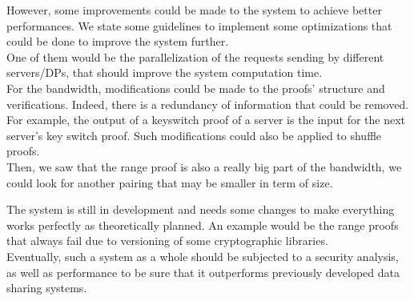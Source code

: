 \documentclass{article}
\begin{document}
However, some improvements could be made to the system to achieve better performances. We state some guidelines to implement some optimizations that could be done to improve the system further.\\

One of them would be the parallelization of the requests sending by different servers/DPs, that should improve the system computation time.\\
For the bandwidth, modifications could be made to the proofs' structure and verifications. Indeed, there is a redundancy of information that could be removed. For example, the output of a keyswitch proof of a server is the input for the next server's key switch proof. Such modifications could also be applied to shuffle proofs.\\
Then, we saw that the range proof is also a really big part of the bandwidth, we could look for another pairing that may be smaller in term of size.

The system is still in development and needs some changes to make everything works perfectly as theoretically planned. An example would be the range proofs that always fail due to versioning of some cryptographic libraries.\\

Eventually, such a system as a whole should be subjected to a security analysis, as well as performance to be sure that it outperforms previously developed data sharing systems.
\end{document}
